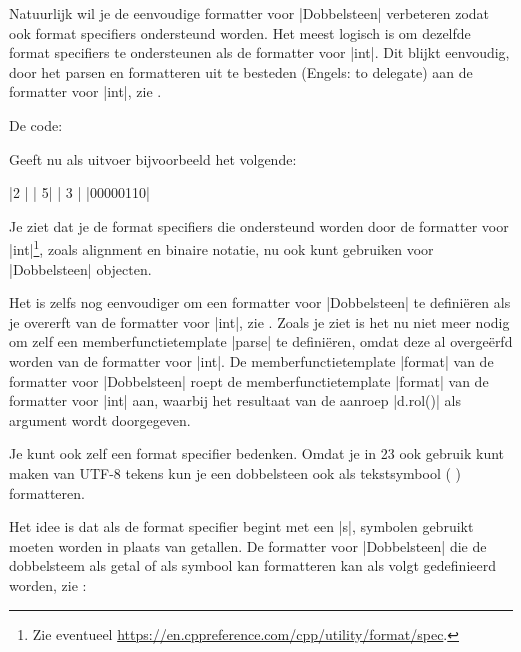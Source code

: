\begin{cpplstShortInline}
Natuurlijk wil je de eenvoudige formatter voor |Dobbelsteen| verbeteren zodat ook format specifiers ondersteund worden.
Het meest logisch is om dezelfde format specifiers te ondersteunen als de formatter voor |int|.
Dit blijkt eenvoudig, door het parsen en formatteren uit te besteden (Engels: to delegate) aan de formatter voor |int|, zie .

De code:

Geeft nu als uitvoer bijvoorbeeld het volgende:
\begin{coutput}
|2       |
|       5|
|   3    |
|00000110|
\end{coutput}
Je ziet dat je de format specifiers die ondersteund worden door de formatter voor |int|\footnote{%
	Zie eventueel \url{https://en.cppreference.com/cpp/utility/format/spec}.
}, zoals alignment en binaire notatie, nu ook kunt gebruiken voor |Dobbelsteen| objecten.

Het is zelfs nog eenvoudiger om een formatter voor |Dobbelsteen| te definiëren als je overerft van de formatter voor |int|, zie .
Zoals je ziet is het nu niet meer nodig om zelf een memberfunctietemplate |parse| te definiëren, omdat deze al overgeërfd worden van de formatter voor |int|.
De memberfunctietemplate |format| van de formatter voor |Dobbelsteen| roept de memberfunctietemplate |format| van de formatter voor |int| aan, waarbij het resultaat van de aanroep |d.rol()| als argument wordt doorgegeven.

Je kunt ook zelf een format specifier bedenken.
Omdat je in \Cpp{}23 ook gebruik kunt maken van UTF-8 tekens kun je een dobbelsteen ook als tekstsymbool (     ) formatteren.

Het idee is dat als de format specifier begint met een |s|, symbolen gebruikt moeten worden in plaats van getallen.
De formatter voor |Dobbelsteen| die de dobbelsteem als getal of als symbool kan formatteren kan als volgt gedefinieerd worden, zie :


\end{cpplstShortInline}
